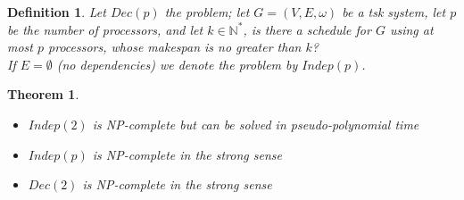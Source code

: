 \documentclass{article}
\newtheorem{thm}{Theorem}
\newtheorem{defi}{Definition}
\begin{document}
\begin{defi}
Let $Dec(p)$ the problem; let $G=(V,E,\omega)$ be a tsk system, let $p$ be the number of processors, and let $k\in \mathbb{N}^*$, is there a schedule for $G$ using at most $p$ processors, whose makespan is no greater than $k$?\\
If $E=\emptyset$ (no dependencies) we denote the problem by $Indep(p)$.
\end{defi}  

\begin{thm}
\begin{itemize}
\item $Indep(2)$ is NP-complete but can be solved in pseudo-polynomial time
\item $Indep(p)$ is NP-complete in the strong sense
\item $Dec(2)$ is NP-complete in the strong sense
\end{itemize}
\end{thm}
\end{document}
